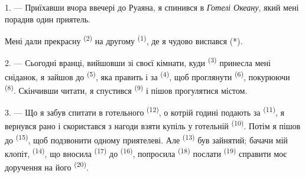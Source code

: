 %
%


\VUsaut{3.0mm}
\VUsaut{1.6mm}
\VUsaut{2.0mm}
\VUsaut{3.4mm}

1. --- Приїхавши вчора ввечері до Руаяна, я спинився в \textit{Готелі Океану},
який мені порадив один приятель.

Мені дали прекрасну  \textsuperscript{(2)} на другому
 \textsuperscript{(1)}, де я чудово виспався (*).

2. --- Сьогодні вранці, вийшовши зі своєї кімнати, куди 
\textsuperscript{(3)} принесла мені сніданок, я зайшов до 
\textsuperscript{(5)}, яка править і за  \textsuperscript{(4)},
щоб проглянути  \textsuperscript{(6)}, покурюючи 
\textsuperscript{(8)}. Скінчивши читати, я спустився 
\textsuperscript{(9)} і пішов прогулятися містом.

3. --- Що я забув спитати в готельного 
\textsuperscript{(12)}, о котрій годині подають за 
\textsuperscript{(11)}, я вернувся рано і скористався з нагоди взяти купіль у
готельній  \textsuperscript{(10)}. Потім я пішов до 
\textsuperscript{(15)}, щоб подзвонити одному приятелеві. Але 
\textsuperscript{(13)} був зайнятий; бачачи мій клопіт, 
\textsuperscript{(14)}, що вносила  \textsuperscript{(17)} до
 \textsuperscript{(16)}, попросила 
\textsuperscript{(18)} послати  \textsuperscript{(19)} справити
моє доручення на його  \textsuperscript{(20)}.

